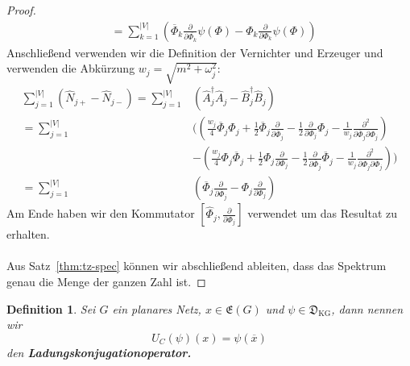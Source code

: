 \documentclass[11pt,a4paper,leqno]{report}
\newtheorem{definition}[theorem]{Definition}
\numberwithin{equation}{chapter}
\begin{document}
\begin{proof}
\begin{align*}
	&=\sum_{k=1}^{|V|}\left(\overline{\Phi}_k\frac{\partial}{\partial\overline{\Phi_{k}}}\psi(\Phi) - \Phi_k\frac{\partial}{\partial\Phi_{k}}\psi(\Phi)\right)
\end{align*}
Anschließend verwenden wir die Definition der Vernichter und Erzeuger und verwenden die Abkürzung \(w_j= \sqrt{m^2 + \omega_j^2}\): 
\begin{align*}
	\sum_{j=1}^{|V|}(\hat{N}_{j +} -\hat{N}_{j -})=\sum_{j=1}^{|V|}&(\hat{A}_j^\dagger \hat{A}_j - \hat{B}_j^\dagger \hat{B}_j)\\
	=\sum_{j=1}^{|V|}&((\frac{w_j}{4}\overline{\Phi}_j\Phi_j +\frac{1}{2}\overline{\Phi}_j\frac{\partial}{\partial\overline{\Phi}_j}-\frac{1}{2}\frac{\partial}{\partial\Phi_j}\Phi_j-\frac{1}{w_j}\frac{\partial^2}{\partial\overline{\Phi}_j\partial\Phi_j})\\&-(\frac{w_j}{4}\Phi_j\overline{\Phi}_j +\frac{1}{2}\Phi_j\frac{\partial}{\partial\Phi_j}-\frac{1}{2}\frac{\partial}{\partial\overline{\Phi}_j}\overline{\Phi}_j-\frac{1}{w_j}\frac{\partial^2}{\partial\Phi_j\partial\overline{\Phi}_j}))\\
	=\sum_{j=1}^{|V|}&(\overline{\Phi}_j\frac{\partial}{\partial\overline{\Phi}_j} - \Phi_j\frac{\partial}{\partial\Phi_j})
\end{align*}
Am Ende haben wir den Kommutator \([\hat{\Phi}_j,\frac{\partial}{\partial \Phi_j}]\) verwendet um das Resultat zu erhalten.\\
\\
Aus Satz~\ref{thm:tz-spec} können wir abschließend ableiten, dass das Spektrum genau die Menge der ganzen Zahl ist.
\end{proof}
\begin{definition}
	Sei $G$ ein planares Netz, $x\in \mathfrak{E}(G)$ und $\psi\in\mathfrak{D}_\mathrm{KG}$, dann nennen wir
	\begin{equation}
		U_C(\psi)(x) =\psi(\overline{x})
	\end{equation}
	den \textbf{Ladungskonjugationoperator.}
\end{definition}
\end{document}
